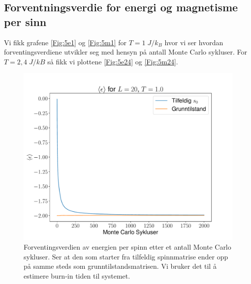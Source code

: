 \documentclass[reprint,english,notitlepage]{revtex4-1}  %
\begin{document}
\subsection*{Forventningsverdie for energi og magnetisme per sinn}

Vi fikk grafene \autoref{Fig:5e1} og \autoref{Fig:5m1} for $T =  1 \; J/k_B $ hvor vi ser hvordan forventingsverdiene utvikler seg med hensyn på antall Monte Carlo sykluser. For $T = 2,4 \; J/kB$ så fikk vi plottene \autoref{Fig:5e24} og \autoref{Fig:5m24}. 

\begin{figure}[H]
\centering
\includegraphics[scale=0.4, trim=1.7cm 0 0 0 ]{../Images/meanepsT1L20.pdf}
\caption{Forventingsverdien av energien per spinn etter et antall Monte Carlo sykluser. Ser at den som starter fra tilfeldig spinnmatrise ender opp på samme steds som grunntilstandsmatrisen. Vi bruker det til å estimere burn-in tiden til systemet.}
\label{Fig:5e1}
\end{figure}
\end{document}
